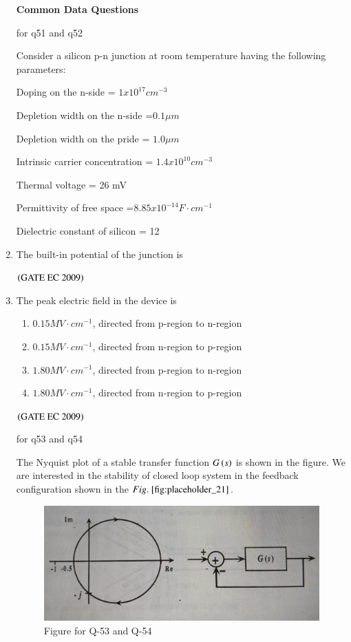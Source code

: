 \documentclass[journal,12pt,onecolumn]{IEEEtran}
\theoremstyle{remark}
\begin{document}
\begin{enumerate}[start=1, label={Q\arabic*.}]
\textbf{Common Data Questions}

for q51 and q52

Consider a silicon p-n junction at room temperature having the following parameters:

Doping on the n-side = $1 x 10^{17} cm^{-3}$

Depletion width on the n-side =$ 0.1 \mu m $

Depletion width on the pride = $1.0 \mu m $

Intrinsic carrier concentration = $1.4 x 10^{10} cm^{-3} $

Thermal voltage = 26 mV 

Permittivity of free space =$8.85 x 10^{-14 }F \cdot cm^{-1} $

Dielectric constant of silicon = 12
\item The built-in potential of the junction is 
\begin{enumerate}
\end{enumerate}
\hfill $\left(\text{GATE EC 2009}\right)$

\item The peak electric field in the device is
\begin{enumerate}
        \item $0.15 MV\cdot cm^{-1}$, directed from p-region to n-region
        \item $0.15 MV\cdot cm^{-1}$, directed from n-region to p-region
        \item $1.80  MV\cdot cm^{-1}$, directed from p-region to n-region
        \item $1.80 MV\cdot cm^{-1}$, directed from n-region to p-region
\end{enumerate}
\hfill $\left(\text{GATE EC 2009}\right)$

for q53 and q54

The Nyquist plot of a stable transfer function $G\left(s\right)$ is shown in the figure. We are interested in the stability of closed loop system in the feedback configuration shown in the $\figref{fig:placeholder_21}$. 
\begin{figure}[H]
    \centering
    \includegraphics[width=0.5\columnwidth]{figs/img_22.jpg}
    \caption{Figure for Q-53 and Q-54}
    \label{fig:placeholder_21}
\end{figure}


\end{enumerate}
\end{document}

